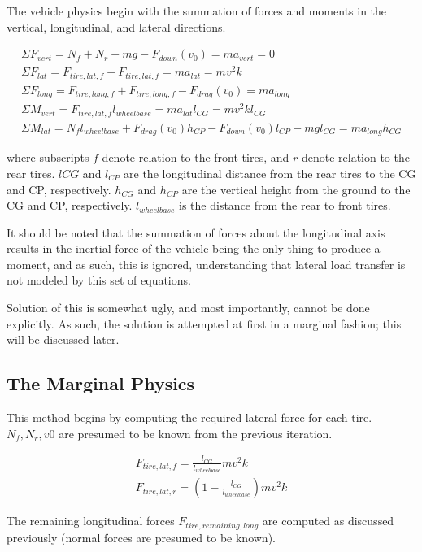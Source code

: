 \documentclass{article}
\begin{document}
The vehicle physics begin with the summation of forces and moments in the vertical, longitudinal, and lateral directions.

\begin{align}
	\Sigma F_{vert} = N_{f} + N_{r} - m g - F_{down}(v_0) = m a_{vert} = 0 \\
	\Sigma F_{lat}  = F_{tire,lat,f} + F_{tire,lat,f} = m a_{lat} = m v^2 k \\
	\Sigma F_{long} = F_{tire,long,f} + F_{tire,long,f} - F_{drag}(v_0) = m a_{long} \\	
	\Sigma M_{vert} = F_{tire,lat,f} l_{wheelbase} = m a_{lat} l_{CG} = m v^2 k l_{CG}\\
	\Sigma M_{lat}  = N_{f} l_{wheelbase} + F_{drag}(v_0) h_{CP} - F_{down}(v_0) l_{CP} - m g l_{CG} = m a_{long} h_{CG}
\end{align}

where subscripts $f$ denote relation to the front tires, and $r$ denote relation to the rear tires. $l{CG}$ and $l_{CP}$ are the longitudinal distance from the rear tires to the CG and CP, respectively. $h_{CG}$ and $h_{CP}$ are the vertical height from the ground to the CG and CP, respectively. $l_{wheelbase}$ is the distance from the rear to front tires.

It should be noted that the summation of forces about the longitudinal axis results in the inertial force of the vehicle being the only thing to produce a moment, and as such, this is ignored, understanding that lateral load transfer is not modeled by this set of equations.

Solution of this is somewhat ugly, and most importantly, cannot be done explicitly. As such, the solution is attempted at first in a marginal fashion; this will be discussed later.

\subsection{The Marginal Physics}
This method begins by computing the required lateral force for each tire. $N_f, N_r, v0$ are presumed to be known from the previous iteration.

\begin{align}
	F_{tire,lat,f} = \frac{l_{CG}}{l_{wheelbase}} m v^2 k \\ 
	F_{tire,lat,r} = (1-\frac{l_{CG}}{l_{wheelbase}}) m v^2 k
\end{align}

The remaining longitudinal forces $F_{tire,remaining,long}$ are computed as discussed previously (normal forces are presumed to be known). 
\end{document}
